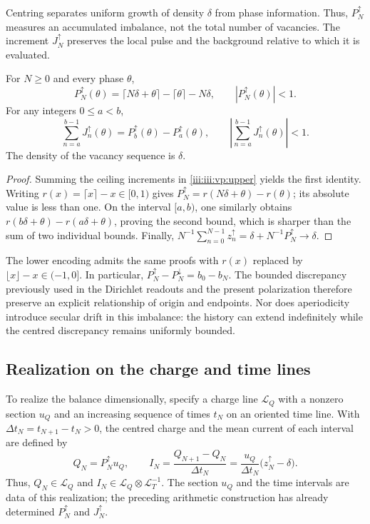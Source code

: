 Centring separates uniform growth of density $\delta$ from
phase information. Thus, $P_N^{\uparrow}$ measures an accumulated imbalance,
not the total number of vacancies. The increment $J_N^{\uparrow}$ preserves
the local pulse and the background relative to which it is evaluated.

\begin{theorem}
For $N\geq0$ and every phase $\theta$,
\begin{equation}
 P_N^{\uparrow}(\theta)
 =\lceil N\delta+\theta\rceil-\lceil\theta\rceil-N\delta,
 \qquad |P_N^{\uparrow}(\theta)|<1.
 \label{iii:iii:vp:bound}
\end{equation}
For any integers $0\leq a<b$,
\begin{equation}
 \sum_{n=a}^{b-1}J_n^{\uparrow}(\theta)
 =P_b^{\uparrow}(\theta)-P_a^{\uparrow}(\theta),
 \qquad
 \left|\sum_{n=a}^{b-1}J_n^{\uparrow}(\theta)\right|<1.
 \label{iii:iii:vp:continuity}
\end{equation}
The density of the vacancy sequence is $\delta$.
\end{theorem}
\begin{proof}
Summing the ceiling increments in \eqref{iii:iii:vp:upper} yields the
first identity. Writing $r(x)=\lceil x\rceil-x\in[0,1)$
gives $P_N^{\uparrow}=r(N\delta+\theta)-r(\theta)$; its absolute
value is less than one. On the interval $[a,b)$, one similarly obtains
$r(b\delta+\theta)-r(a\delta+\theta)$, proving
the second bound, which is sharper than the sum of two individual bounds.
Finally,
$N^{-1}\sum_{n=0}^{N-1}z_n^{\uparrow}
=\delta+N^{-1}P_N^{\uparrow}\to\delta$.
\end{proof}

The lower encoding admits the same proofs with
$r(x)$ replaced by $\lfloor x\rfloor-x\in(-1,0]$. In particular,
$P_N^{\uparrow}-P_N^{\downarrow}=b_0-b_N$. The bounded discrepancy
previously used in the Dirichlet readouts and the present polarization
therefore preserve an explicit relationship of origin and endpoints.
Nor does aperiodicity introduce secular drift in this imbalance:
the history can extend indefinitely while the centred discrepancy
remains uniformly bounded.

\subsection{Realization on the charge and time lines}

To realize the balance dimensionally, specify a charge line
$\mathcal L_Q$ with a nonzero section $u_Q$ and an increasing sequence of
times $t_N$ on an oriented time line. With
$\Delta t_N=t_{N+1}-t_N>0$, the centred charge and the mean current of
each interval are defined by
\begin{equation}
 Q_N=P_N^{\uparrow}u_Q,\qquad
 I_N=\frac{Q_{N+1}-Q_N}{\Delta t_N}
     =\frac{u_Q}{\Delta t_N}\bigl(z_N^{\uparrow}-\delta\bigr).
 \label{iii:iii:vp:dimensional}
\end{equation}
Thus, $Q_N\in\mathcal L_Q$ and
$I_N\in\mathcal L_Q\otimes\mathcal L_T^{-1}$. The section $u_Q$ and
the time intervals are data of this realization; the preceding arithmetic
construction has already determined $P_N^{\uparrow}$ and
$J_N^{\uparrow}$.

